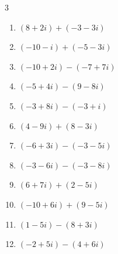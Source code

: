 \begin{multicols}{3}
\begin{enumerate}
        \phantom{$\displaystyle =6-9i$}

  \item $\displaystyle (8+2i) + (-3-3i)$

        \phantom{$\displaystyle =5-i$}

  \item $\displaystyle (-10-i) + (-5-3i)$

        \phantom{$\displaystyle =-15-4i$}

  \item $\displaystyle (-10+2i) - (-7+7i)$

        \phantom{$\displaystyle =-3-5i$}

  \item $\displaystyle (-5+4i) - (9-8i)$

        \phantom{$\displaystyle =-14+12i$}

  \item $\displaystyle (-3+8i) - (-3+i)$

        \phantom{$\displaystyle =7i$}

  \item $\displaystyle (4-9i) + (8-3i)$

        \phantom{$\displaystyle =12-12i$}

  \item $\displaystyle (-6+3i) - (-3-5i)$

        \phantom{$\displaystyle =-3+8i$}

  \item $\displaystyle (-3-6i) - (-3-8i)$

        \phantom{$\displaystyle =2i$}

\columnbreak %

\resetques

  \item $\displaystyle (6+7i) + (2-5i)$

        \phantom{$\displaystyle =8+2i$}

  \item $\displaystyle (-10+6i) + (9-5i)$

        \phantom{$\displaystyle =-1+i$}

  \item $\displaystyle (1-5i) - (8+3i)$

        \phantom{$\displaystyle =-7-8i$}

  \item $\displaystyle (-2+5i) - (4+6i)$

        \phantom{$\displaystyle =-6-i$}


\end{enumerate}
\end{multicols}
